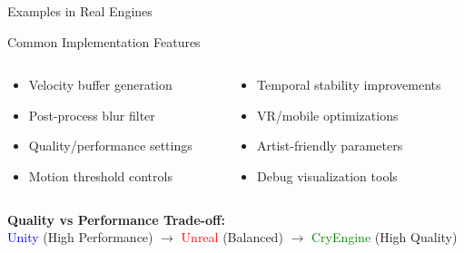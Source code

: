 \documentclass[aspectratio=169]{beamer}
\begin{document}
\begin{frame}{Examples in Real Engines}
    \vspace{0.05cm}
    
    \begin{block}{Common Implementation Features}
        \begin{columns}[t]
            \begin{column}{0.48\textwidth}
                \begin{itemize}
                    \item Velocity buffer generation
                    \item Post-process blur filter
                    \item Quality/performance settings
                    \item Motion threshold controls
                \end{itemize}
            \end{column}
            \begin{column}{0.48\textwidth}
                \begin{itemize}
                    \item Temporal stability improvements
                    \item VR/mobile optimizations
                    \item Artist-friendly parameters
                    \item Debug visualization tools
                \end{itemize}
            \end{column}
        \end{columns}
    \end{block}
    
    \vspace{0.05cm}
    
    \begin{center}
        \textbf{Quality vs Performance Trade-off:} \\
        \textcolor{blue}{Unity} (High Performance) $\rightarrow$ 
        \textcolor{red}{Unreal} (Balanced) $\rightarrow$ 
        \textcolor{green}{CryEngine} (High Quality)
    \end{center}
\end{frame}
\end{document}
